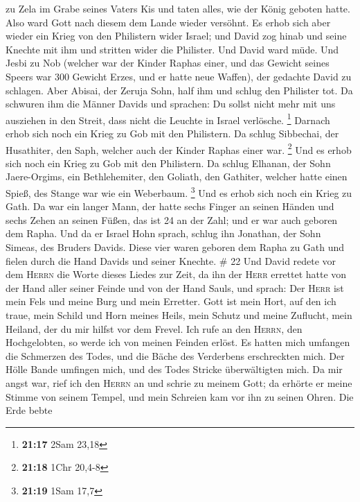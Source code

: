 zu Zela im Grabe seines Vaters Kis und taten alles, wie der König
geboten hatte. Also ward Gott nach diesem dem Lande wieder versöhnt.
 Es erhob sich aber wieder ein Krieg von den Philistern
wider Israel; und David zog hinab und seine Knechte mit ihm und stritten
wider die Philister. Und David ward müde.  Und Jesbi zu
Nob (welcher war der Kinder Raphas einer, und das Gewicht seines Speers
war 300 Gewicht Erzes, und er hatte neue Waffen), der gedachte David zu
schlagen.  Aber Abisai, der Zeruja Sohn, half ihm und
schlug den Philister tot. Da schwuren ihm die Männer Davids und
sprachen: Du sollst nicht mehr mit uns ausziehen in den Streit, dass
nicht die Leuchte in Israel verlösche. \footnote{\textbf{21:17} 2Sam
  23,18}  Darnach erhob sich noch ein Krieg zu Gob mit
den Philistern. Da schlug Sibbechai, der Husathiter, den Saph, welcher
auch der Kinder Raphas einer war. \footnote{\textbf{21:18} 1Chr 20,4-8}
 Und es erhob sich noch ein Krieg zu Gob mit den
Philistern. Da schlug Elhanan, der Sohn Jaere-Orgims, ein Bethlehemiter,
den Goliath, den Gathiter, welcher hatte einen Spieß, des Stange war wie
ein Weberbaum. \footnote{\textbf{21:19} 1Sam 17,7}  Und
es erhob sich noch ein Krieg zu Gath. Da war ein langer Mann, der hatte
sechs Finger an seinen Händen und sechs Zehen an seinen Füßen, das ist
24 an der Zahl; und er war auch geboren dem Rapha.  Und
da er Israel Hohn sprach, schlug ihn Jonathan, der Sohn Simeas, des
Bruders Davids.  Diese vier waren geboren dem Rapha zu
Gath und fielen durch die Hand Davids und seiner Knechte. \# 22
 Und David redete vor dem \textsc{Herrn} die Worte dieses
Liedes zur Zeit, da ihn der \textsc{Herr} errettet hatte von der Hand
aller seiner Feinde und von der Hand Sauls, und sprach: 
Der \textsc{Herr} ist mein Fels und meine Burg und mein Erretter.
 Gott ist mein Hort, auf den ich traue, mein Schild und
Horn meines Heils, mein Schutz und meine Zuflucht, mein Heiland, der du
mir hilfst vor dem Frevel.  Ich rufe an den
\textsc{Herrn}, den Hochgelobten, so werde ich von meinen Feinden
erlöst.  Es hatten mich umfangen die Schmerzen des Todes,
und die Bäche des Verderbens erschreckten mich.  Der Hölle
Bande umfingen mich, und des Todes Stricke überwältigten mich.
 Da mir angst war, rief ich den \textsc{Herrn} an und
schrie zu meinem Gott; da erhörte er meine Stimme von seinem Tempel, und
mein Schreien kam vor ihn zu seinen Ohren.  Die Erde bebte
